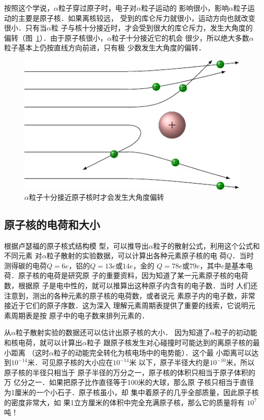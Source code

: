 按照这个学说，$\alpha$粒子穿过原子时，电子对$\alpha$粒子运动的
影响很小，影响$\alpha$粒子运动的主要是原子核．如果离核较远，
受到的库仑斥力就很小，运动方向也就改变很小．只有当$\alpha$粒
子与核十分接近时，才会受到很大的库仑斥力，发生大角度的
偏转（图~\ref{fig_C_8-3}）．由于原子核很小，$\alpha$粒子十分接近它的机会
很少，所以绝大多数$\alpha$粒子基本上仍按直线方向前进，只有极
少数发生大角度的偏转．
\begin{figure}[htbp]
    \centering
    \includegraphics{fig/C/8-3.pdf}
    \caption{$\alpha$粒子十分接近原子核时才会发生大角度偏转}\label{fig_C_8-3}
\end{figure}


\subsection{原子核的电荷和大小} 

根据卢瑟福的原子核式结构模
型，可以推导出$\alpha$粒子的散射公式，利用这个公式和不同元素
对$\alpha$粒子散射的实验数据，可以计算出各种元素原子核的电
荷$Q$．当时测得碳的电荷$Q=6e$，铝的$Q=13e$或$14e$，金的
$Q=78e$或$79e$，其中$e$是基本电荷．原子核的电荷是研究原
子的重要资料，因为知道了某一元素原子核的电荷数，根据原
子是电中性的，就可以推算出这种原子内含有的电子数．当时
人们还注意到，测出的各种元素的原子核的电荷数，或者说元
素原子内的电子数，非常接近于它们的原子序数．这为深入
理解元素周期表提供了重要的线索，它说明元素周期表是按
原子中的电子数来排列元素的．

从$\alpha$粒子散射实验的数据还可以估计出原子核的大小．
因为知道了$\alpha$粒子的初动能和核电荷，就可以计算出$\alpha$粒子
跟原子核发生对心碰撞时可能达到的离原子核的最小距离
（这时$\alpha$粒子的动能完全转化为核电场中的电势能）．这个最
小距离可以达到$10^{-14}$米．可见原子核的大小应在$10^{-14}$米
以下，原子半径大约是$10^{-10}$米，所以原子核的半径只相当于
原子半径的万分之一，原子核的体积只相当于原子体积的万
亿分之一．如果把原子比作直径等于100米的大球，那么原
子核只相当于直径为1厘米的一个小石子．原子核虽小，却
集中着原子的几乎全部质量，因此原子核的密度非常大，如
果1立方厘米的体积中完全充满原子核，那么它的质量将有
$10^7$吨！


